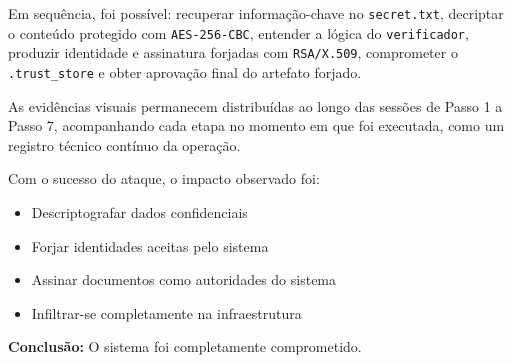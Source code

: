 \documentclass[12pt,a4paper]{article}
\begin{document}
Em sequência, foi possível: recuperar informação-chave no \texttt{secret.txt}, decriptar o conteúdo protegido com \texttt{AES-256-CBC}, entender a lógica do \texttt{verificador}, produzir identidade e assinatura forjadas com \texttt{RSA/X.509}, comprometer o \texttt{.trust\_store} e obter aprovação final do artefato forjado.

As evidências visuais permanecem distribuídas ao longo das sessões de Passo 1 a Passo 7, acompanhando cada etapa no momento em que foi executada, como um registro técnico contínuo da operação.

Com o sucesso do ataque, o impacto observado foi:

\begin{itemize}
    \item Descriptografar dados confidenciais
    \item Forjar identidades aceitas pelo sistema
    \item Assinar documentos como autoridades do sistema
    \item Infiltrar-se completamente na infraestrutura
\end{itemize}

\textbf{Conclusão:} O sistema foi completamente comprometido.
\end{document}
